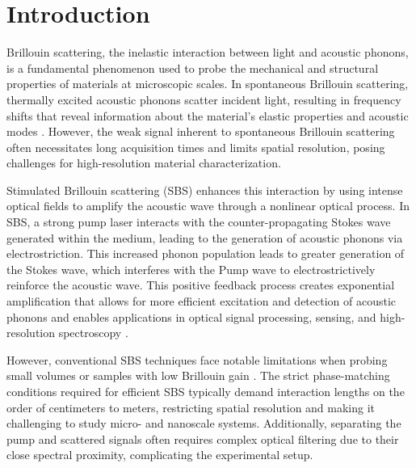 \documentclass[%
  reprint,
  superscriptaddress,
  amsmath,amssymb,
  aps,
  prapplied,
]{revtex4-2}
\begin{document}
\maketitle



\section{Introduction}
\label{sec:Introduction}

Brillouin scattering, the inelastic interaction between light and acoustic phonons, is a fundamental phenomenon used to probe the mechanical and structural properties of materials at microscopic scales. In spontaneous Brillouin scattering, thermally excited acoustic phonons scatter incident light, resulting in frequency shifts that reveal information about the material's elastic properties and acoustic modes \cite{boyd2020nonlinear}. However, the weak signal inherent to spontaneous Brillouin scattering often necessitates long acquisition times and limits spatial resolution, posing challenges for high-resolution material characterization.

Stimulated Brillouin scattering (SBS) enhances this interaction by using intense optical fields to amplify the acoustic wave through a nonlinear optical process. In SBS, a strong pump laser interacts with the counter-propagating Stokes wave generated within the medium, leading to the generation of acoustic phonons via electrostriction. This increased phonon population leads to greater generation of the Stokes wave, which interferes with the Pump wave to electrostrictively reinforce the acoustic wave. This positive feedback process creates exponential amplification that allows for more efficient excitation and detection of acoustic phonons and enables applications in optical signal processing, sensing, and high-resolution spectroscopy \cite{eggleton2013inducing, fotiadi2023brillouin, kobyakov2009stimulated, ippen1972stimulated}.

However, conventional SBS techniques face notable limitations when probing small volumes or samples with low Brillouin gain \cite{rakich2012giant, gyger2020observation}. The strict phase-matching conditions required for efficient SBS typically demand interaction lengths on the order of centimeters to meters, restricting spatial resolution and making it challenging to study micro- and nanoscale systems. Additionally, separating the pump and scattered signals often requires complex optical filtering due to their close spectral proximity, complicating the experimental setup.
\end{document}
